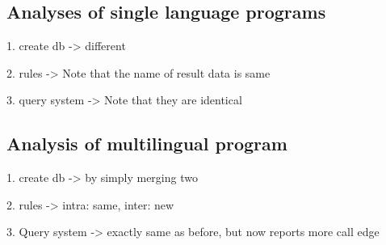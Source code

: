 \subsection{Analyses of single language programs}
1. create db -> different 

2. rules -> Note that the name of result data is same

3. query system -> Note that they are identical

\subsection{Analysis of multilingual program}
1. create db -> by simply merging two

2. rules -> intra: same, inter: new

3. Query system -> exactly same as before, but now reports more call edge
